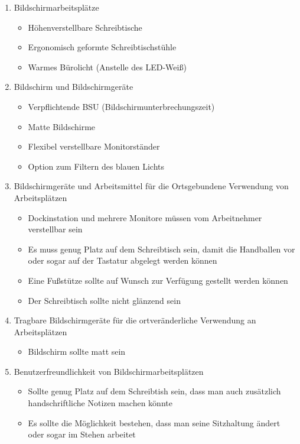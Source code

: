 \documentclass[a4paper, 12pt]{report}
\begin{document}
\begin{enumerate}
    \item Bildschirmarbeitsplätze
        \begin{itemize}
            \item Höhenverstellbare Schreibtische
            \item Ergonomisch geformte Schreibtischstühle
            \item Warmes Bürolicht (Anstelle des LED-Weiß)
        \end{itemize}
    \item Bildschirm und Bildschirmgeräte
        \begin{itemize}
            \item Verpflichtende BSU (Bildschirmunterbrechungszeit)
            \item Matte Bildschirme
            \item Flexibel verstellbare Monitorständer
            \item Option zum Filtern des blauen Lichts
        \end{itemize}
    \item Bildschirmgeräte und Arbeitsmittel für die Ortsgebundene Verwendung 
        von Arbeitsplätzen
        \begin{itemize}
            \item Dockinstation und mehrere Monitore müssen vom Arbeitnehmer 
                verstellbar sein
            \item Es muss genug Platz auf dem Schreibtisch sein, damit die 
                Handballen vor oder sogar auf der Tastatur abgelegt werden 
                können
            \item Eine Fußstütze sollte auf Wunsch zur Verfügung gestellt werden
                können
            \item Der Schreibtisch sollte nicht glänzend sein
        \end{itemize}
    \item Tragbare Bildschirmgeräte für die ortveränderliche Verwendung an 
        Arbeitsplätzen
        \begin{itemize}
            \item Bildschirm sollte matt sein
        \end{itemize}
    \item Benutzerfreundlichkeit von Bildschirmarbeitsplätzen
        \begin{itemize}
            \item Sollte genug Platz auf dem Schreibtish sein, dass man auch 
                zusätzlich handschriftliche Notizen machen könnte
            \item Es sollte die Möglichkeit bestehen, dass man seine Sitzhaltung
                ändert oder sogar im Stehen arbeitet
        \end{itemize}
\end{enumerate}
\end{document}
